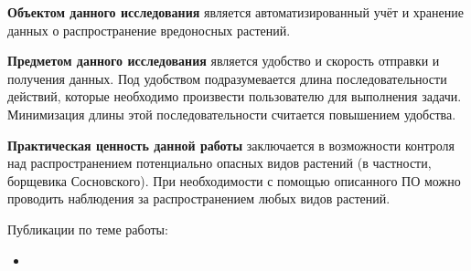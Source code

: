 \tab
\textbf{Объектом данного исследования} является автоматизированный учёт и хранение данных о распространение вредоносных растений.

\tab
\textbf{Предметом данного исследования} является удобство и скорость отправки и получения данных.
Под удобством подразумевается длина последовательности действий, которые необходимо произвести пользователю для выполнения задачи.
Минимизация длины этой последовательности считается повышением удобства.

\tab
\textbf{Практическая ценность данной работы} заключается в возможности контроля над распространением потенциально опасных видов растений (в частности, борщевика Сосновского).
При необходимости с помощью описанного ПО можно проводить наблюдения за распространением любых видов растений.

\tab Публикации по теме работы:
\begin{itemize}
	\item {}
\end{itemize}
